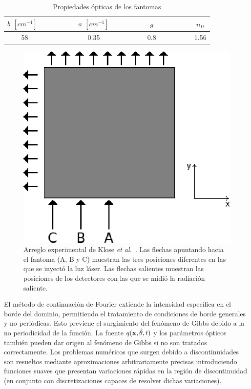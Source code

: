  
 \begin{table}[h!]
\caption{Propiedades ópticas de los fantomas}
\vspace{-0.6cm}
\begin{center}
\begin{tabular}{cccc}
\hline
$b$ $[cm^{-1}]$ ~~~~~~~~ & $a$ $[cm^{-1}]$ & ~~~~~~~~ $g$  ~~~~~~~~ & $n_{\Omega}$ \\
\hline
58 ~~~~~~~~ & 0.35 & ~~~~~~~~  0.8 ~~~~~~~~ & 1.56 \\
\hline
\end{tabular}
\label{tab:tabopt}
\end{center}
\end{table}

\begin{figure}[h!]
\centering
  \includegraphics[width=0.4\linewidth]{figuras/phantom.eps}
   \caption{Arreglo experimental de Klose \textit{et al.}~\cite{Klose2002}. 
   Las flechas apuntando hacia el fantoma (A, B y C)  
   muestran las tres posiciones diferentes en las que se inyectó 
   la luz láser. Las flechas salientes muestran las posiciones de los detectores 
   con las que se midió la radiación saliente.}
 \label{fig:phantom}
\end{figure}

El método de continuación de Fourier extiende 
la intensidad específica en el borde del dominio, 
permitiendo el tratamiento de condiciones de borde generales y no periódicas.  
Esto previene el surgimiento del fenómeno de Gibbs debido a la no periodicidad 
de la función. La fuente $q(\mathbf{x},\hat{\theta},t)$ y los parámetros ópticos 
también pueden dar origen al fenómeno de Gibbs si no son 
tratados correctamente. Los problemas numéricos que surgen 
debido a discontinuidades son resueltos mediante aproximaciones arbitrariamente precisas 
introduciendo funciones suaves que presentan 
variaciones rápidas en la región de discontinuidad (en conjunto 
con discretizaciones capaces de resolver dichas variaciones).

